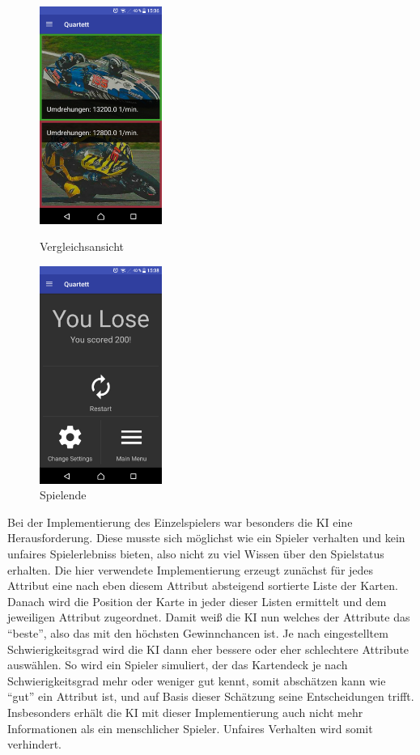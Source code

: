 \documentclass{scrartcl}
\begin{document}
\begin{figure}
  \centering
  \begin{minipage}{0.45\textwidth}
    \centering
    \includegraphics[width=4cm]{img/game_compare.png}
    \caption{Vergleichsansicht}
  \end{minipage}
  \hfill
  \begin{minipage}{0.45\textwidth}
    \centering
    \includegraphics[width=4cm]{img/game_end.png}
    \caption{Spielende}
  \end{minipage}
\end{figure}

\noindent
Bei der Implementierung des Einzelspielers war besonders die KI eine
Herausforderung. Diese musste sich möglichst wie ein Spieler verhalten und kein
unfaires Spielerlebniss bieten, also nicht zu viel Wissen über den Spielstatus
erhalten. Die hier verwendete Implementierung erzeugt zunächst für jedes
Attribut eine nach eben diesem Attribut absteigend sortierte Liste der Karten.
Danach wird die Position der Karte in jeder dieser Listen ermittelt und dem
jeweiligen Attribut zugeordnet. Damit weiß die KI nun welches der Attribute das
\enquote{beste}, also das mit den höchsten Gewinnchancen ist. Je nach
eingestelltem Schwierigkeitsgrad wird die KI dann eher bessere oder eher
schlechtere Attribute auswählen. So wird ein Spieler simuliert, der das
Kartendeck je nach Schwierigkeitsgrad mehr oder weniger gut kennt, somit
abschätzen kann wie \enquote{gut} ein Attribut ist, und auf Basis dieser
Schätzung seine Entscheidungen trifft. Insbesonders erhält die KI mit dieser
Implementierung auch nicht mehr Informationen als ein menschlicher Spieler.
Unfaires Verhalten wird somit verhindert.
\end{document}
